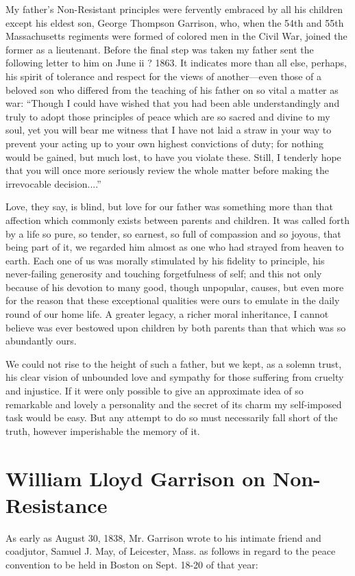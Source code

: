\documentclass{book}
\begin{document}
My father’s Non-Resistant principles were fervently embraced by all his children except his eldest son, George Thompson Garrison, who, when the 54th and 55th Massachusetts regiments were formed of colored men in the Civil War, joined the former as a lieutenant. Before the final step was taken my father sent the following letter to him on June ii ? 1863. It indicates more than all else, perhaps, his spirit of tolerance and respect for the views of another—even those of a beloved son who differed from the teaching of his father on so vital a matter as war: “Though I could have wished that you had been able understandingly and truly to adopt those principles of peace which are so sacred and divine to my soul, yet you will bear me witness that I have not laid a straw in your way to prevent your acting up to your own highest convictions of duty; for nothing would be gained, but much lost, to have you violate these. Still, I tenderly hope that you will once more seriously review the whole matter before making the irrevocable decision....”

Love, they say, is blind, but love for our father was something more than that affection which commonly exists between parents and children. It was called forth by a life so pure, so tender, so earnest, so full of compassion and so joyous, that being part of it, we regarded him almost as one who had strayed from heaven to earth. Each one of us was morally stimulated by his fidelity to principle, his never-failing generosity and touching forgetfulness of self; and this not only because of his devotion to many good, though unpopular, causes, but even more for the reason that these exceptional qualities were ours to emulate in the daily round of our home life. A greater legacy, a richer moral inheritance, I cannot believe was ever bestowed upon children by both parents than that which was so abundantly ours.

We could not rise to the height of such a father, but we kept, as a solemn trust, his clear vision of unbounded love and sympathy for those suffering from cruelty and injustice. If it were only possible to give an approximate idea of so remarkable and lovely a personality and the secret of its charm my self-imposed task would be easy. But any attempt to do so must necessarily fall short of the truth, however imperishable the memory of it.

\chapter{William Lloyd Garrison on Non-Resistance}
\label{chapter-2}
As early as August 30, 1838, Mr. Garrison wrote to his intimate friend and coadjutor, Samuel J. May, of Leicester, Mass. as follows in regard to the peace convention to be held in Boston on Sept. 18-20 of that year:
\end{document}
